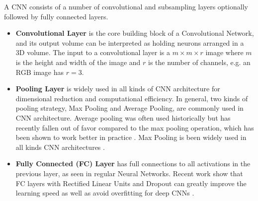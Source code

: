 A CNN consists of a number of convolutional and subsampling layers optionally followed by fully connected layers.
\begin{itemize}
	\item \textbf{Convolutional Layer} is the core building block of a Convolutional Network, and its output volume can be interpreted as holding neurons arranged in a 3D volume. The input to a convolutional layer is a $m \times m \times r$ image where $m$ is the height and width of the image and $r$ is the number of channels, e.g. an RGB image has $r=3$.
	
	\item \textbf{Pooling Layer} is widely used in all kinds of CNN architecture for dimensional reduction and computational efficiency. In general, two kinds of pooling strategy, Max Pooling and Average Pooling, are commonly used in CNN architecture. Average pooling was often used historically but has recently fallen out of favor compared to the max pooling operation, which has been shown to work better in practice \cite{malmaud2015s} \cite{szegedy2014going}. Max Pooling is been widely used in all kinds CNN architectures \cite{boureau2010theoretical} \cite{yang2009linear}. 
	
	\item \textbf{Fully Connected (FC) Layer} has full connections to all activations in the previous layer, as seen in regular Neural Networks. Recent work show that FC layers with Rectified Linear Units and Dropout can greatly improve the learning speed as well as avoid overfitting for deep CNNs \cite{hinton2012improving} \cite{nair2010rectified}.
	
\end{itemize}

